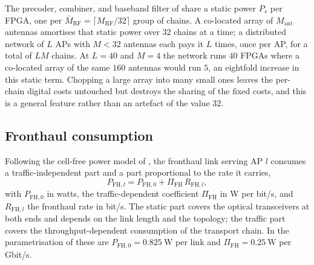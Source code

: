 \begin{remark}
\label{rem:fpga}
The precoder, combiner, and baseband filter of  share a static
power $P_{s}$ per FPGA, one per $\bar M_{\mathrm{RF}}=\lceil
M_{\mathrm{RF}}/32\rceil$ group of chains. A co-located array of
$M_{\mathrm{ant}}$ antennas amortises that static power over 32 chains at a time;
a distributed network of $L$ APs with $M<32$ antennas each pays it $L$ times,
once per AP, for a total of $LM$ chains. At $L=40$ and $M=4$ the network runs
$40$ FPGAs where a co-located array of the same $160$ antennas would run $5$, an
eightfold increase in this static term. Chopping a large array into many small
ones leaves the per-chain digital costs untouched but destroys the sharing of
the fixed costs, and this is a general feature rather than an artefact of the
value $32$.
\end{remark}

\subsection{Fronthaul consumption}
\label{ssec:dmimo_fh}

Following the cell-free power model of \cite{ngo2018total}, the fronthaul link
serving AP $l$ consumes a traffic-independent part and a part proportional to the
rate it carries,
\begin{equation}
\label{eq:fh_basic}
P_{\mathrm{FH},l} = P_{\mathrm{FH},0} + \Pi_{\mathrm{FH}}\,R_{\mathrm{FH},l},
\end{equation}
with $P_{\mathrm{FH},0}$ in watts, the traffic-dependent coefficient
$\Pi_{\mathrm{FH}}$ in W per bit/s, and $R_{\mathrm{FH},l}$ the fronthaul rate in
bit/s. The static part covers the optical transceivers at both ends and depends
on the link length and the topology; the traffic part covers the
throughput-dependent consumption of the transport chain. In the parametrisation
of \cite{ngo2018total} these are $P_{\mathrm{FH},0}=\SI{0.825}{\watt}$ per link
and $\Pi_{\mathrm{FH}}=\SI{0.25}{\watt}$ per Gbit/s.

